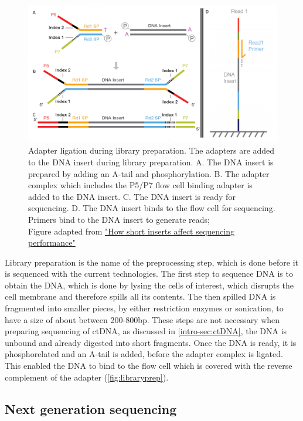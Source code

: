 \begin{figure}[!ht]
\centering
\includegraphics[width=.9\linewidth]{Figures/LibraryPreparation.png}
\caption[Library preparation for NGS]{Adapter ligation during library preparation. The adapters are added to the DNA insert during library preparation. A. The DNA insert is prepared by adding an A-tail and phosphorylation. B. The adapter complex which includes the P5/P7 flow cell binding adapter is added to the DNA insert. C. The DNA insert is ready for sequencing. D. The DNA insert binds to the flow cell for sequencing. Primers bind to the DNA insert to generate reads; \\Figure adapted from \href{https://sapac.support.illumina.com/bulletins/2020/12/how-short-inserts-affect-sequencing-performance.html}{"How short inserts affect sequencing performance"}\protect\cite{Illumina2020}}\label{fig:libraryprep}
\end{figure}

Library preparation is the name of the preprocessing step, which is done before it is sequenced with the current technologies. The first step to sequence DNA is to obtain the DNA, which is done by lysing the cells of interest, which disrupts the cell membrane and therefore spills all its contents. The then spilled DNA is fragmented into smaller pieces, by either restriction enzymes or sonication, to have a size of about between 200-800bp. These steps are not necessary when preparing sequencing of ctDNA, as discussed in \autoref{intro-sec:ctDNA}, the DNA is unbound and already digested into short fragments.
Once the DNA is ready, it is phosphorelated and an A-tail is added, before the adapter complex is ligated. This enabled the DNA to bind to the flow cell which is covered with the reverse complement of the adapter (\autoref{fig:libraryprep}). 

\subsection{Next generation sequencing}
\label{intro-sec:ngs}

